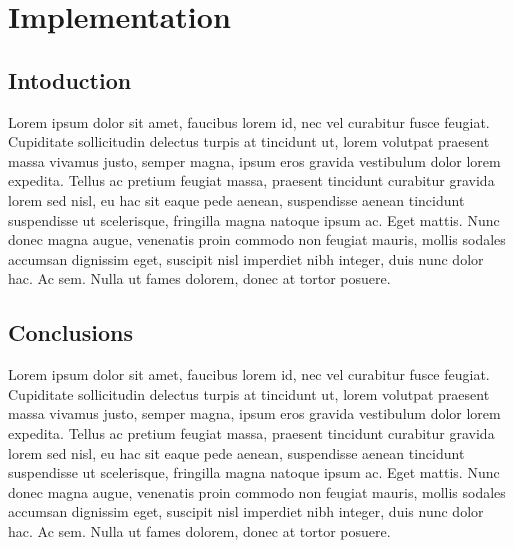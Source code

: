 \chapter{Implementation}

\section{Intoduction}
 Lorem ipsum dolor sit amet, faucibus lorem id, nec vel curabitur fusce feugiat. Cupiditate sollicitudin delectus turpis at tincidunt ut, lorem volutpat praesent massa vivamus justo, semper magna, ipsum eros gravida vestibulum dolor lorem expedita. Tellus ac pretium feugiat massa, praesent tincidunt curabitur gravida lorem sed nisl, eu hac sit eaque pede aenean, suspendisse aenean tincidunt suspendisse ut scelerisque, fringilla magna natoque ipsum ac. Eget mattis. Nunc donec magna augue, venenatis proin commodo non feugiat mauris, mollis sodales accumsan dignissim eget, suscipit nisl imperdiet nibh integer, duis nunc dolor hac. Ac sem. Nulla ut fames dolorem, donec at tortor posuere.
  
  
  \section{Conclusions}
Lorem ipsum dolor sit amet, faucibus lorem id, nec vel curabitur fusce feugiat. Cupiditate sollicitudin delectus turpis at tincidunt ut, lorem volutpat praesent massa vivamus justo, semper magna, ipsum eros gravida vestibulum dolor lorem expedita. Tellus ac pretium feugiat massa, praesent tincidunt curabitur gravida lorem sed nisl, eu hac sit eaque pede aenean, suspendisse aenean tincidunt suspendisse ut scelerisque, fringilla magna natoque ipsum ac. Eget mattis. Nunc donec magna augue, venenatis proin commodo non feugiat mauris, mollis sodales accumsan dignissim eget, suscipit nisl imperdiet nibh integer, duis nunc dolor hac. Ac sem. Nulla ut fames dolorem, donec at tortor posuere.
